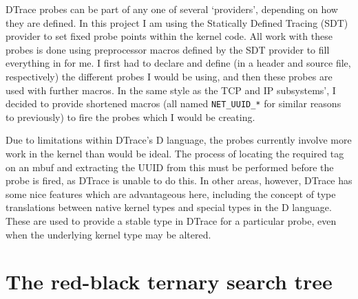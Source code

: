 \documentclass[a4paper,12pt,twoside,openright]{report}
\begin{document}
	DTrace probes can be part of any one of several `providers', depending on how they are defined. In this project I am using the Statically Defined Tracing (SDT) provider to set fixed probe points within the kernel code. All work with these probes is done using preprocessor macros defined by the SDT provider to fill everything in for me. I first had to declare and define (in a header and source file, respectively) the different probes I would be using, and then these probes are used with further macros. In the same style as the TCP and IP subsystems', I decided to provide shortened macros (all named \verb|NET_UUID_*| for similar reasons to previously) to fire the probes which I would be creating.
	
	Due to limitations within DTrace's D language, the probes currently involve more work in the kernel than would be ideal. The process of locating the required tag on an mbuf and extracting the UUID from this must be performed before the probe is fired, as DTrace is unable to do this. In other areas, however, DTrace has some nice features which are advantageous here, including the concept of type translations between native kernel types and special types in the D language. These are used to provide a stable type in DTrace for a particular probe, even when the underlying kernel type may be altered.
	
	\section{The red-black ternary search tree}
	\label{sec:TST-impl}
	
\end{document}
